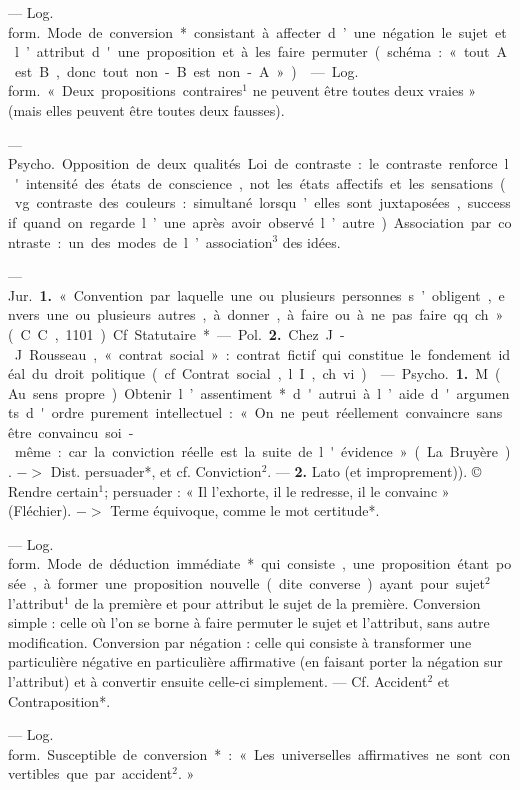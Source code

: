 \begin{itemize}[leftmargin=1cm, label=, itemsep=11pt]
 — \si{Log. form.} Mode
de conversion* consistant à affecter
d’une négation le sujet et l’attribut
d'une proposition et à les faire permuter (schéma : « tout A est B,
donc tout non-B est non-A »).

 — \si{Log. form.} « Deux propositions contraires$^1$
ne peuvent être toutes deux vraies »
(mais elles peuvent être toutes deux
fausses).

 — \si{Psycho.} Opposition de
deux qualités. Loi de contraste : le
contraste renforce l'intensité des
états de conscience, not. les états
affectifs et les sensations (vg. contraste des couleurs : simultané lorsqu’elles sont juxtaposées, successif
quand on regarde l’une après avoir
observé l’autre). Association par contraste :
un des modes de l’association$^3$ des idées.

 — \si{Jur.} {\bf 1.} « Convention par
laquelle une ou plusieurs personnes
s’obligent, envers une ou plusieurs
autres, à donner, à faire ou à ne
pas faire qq. ch. » (C. C., 1101). Cf.
Statutaire*.

— \si{Pol.}  {\bf 2.} Chez J.-J. Rousseau,
«contrat social »: contrat fictif qui
constitue le fondement idéal du
droit politique (cf. Contrat social,
l. I, ch. vi).

 — \si{Psycho.} {\bf 1.} M (Au sens
propre). Obtenir  l’assentiment*
d'autrui à l’aide d'arguments d'ordre
purement intellectuel : « On ne peut
réellement convaincre sans être
convaincu soi-même: car la conviction réelle est la suite de l'évidence »
(La Bruyère). $->$ Dist. persuader*,
et cf. Conviction$^2$. —  {\bf 2.} Lato (et
improprement)). © Rendre certain$^1$;
persuader : « Il l’exhorte, il le redresse, il le convainc » (Fléchier).
$->$ Terme équivoque, comme le
mot certitude*.

 — \si{Log. form.} Mode de
déduction immédiate* qui consiste,
une proposition étant posée, à former une proposition nouvelle (dite
converse) ayant pour sujet$^2$ l'attribut$^1$ de la première et pour attribut le sujet de la première. Conversion simple : celle où l’on se borne à
faire permuter le sujet et l’attribut,
sans autre modification. Conversion
par négation : celle qui consiste à
transformer une particulière négative en particulière affirmative (en
faisant porter la négation sur l’attribut) et à convertir ensuite celle-ci
simplement. — Cf. Accident$^2$ et
Contraposition*.

 — \si{Log. form.} Susceptible de conversion* : « Les universelles
affirmatives ne sont convertibles que par accident$^2$. »


\end{itemize}

